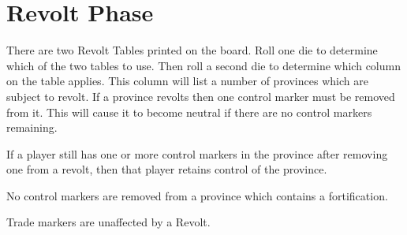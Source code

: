 \section{Revolt Phase}

There are two Revolt Tables printed on the board. Roll one die to determine which of the two tables to use. Then roll a second die to determine which column on the table applies. This column will list a number of provinces which are subject to revolt. If a province revolts then one control marker must be removed from it. This will cause it to become neutral if there are no control markers remaining.

If a player still has one or more control markers in the province after removing one from a revolt, then that player retains control of the province.

No control markers are removed from a province which contains a fortification.

Trade markers are unaffected by a Revolt.